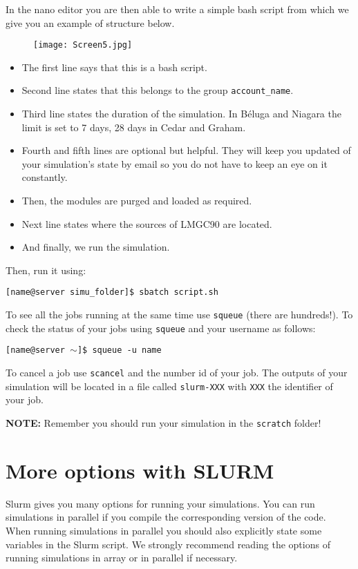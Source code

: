\documentclass[12pt]{article}
\begin{document}
In the nano editor you are then able to write a simple bash script from which we give you an example of structure below.
\begin{figure}[H]
  \centering
  \texttt{[image: Screen5.jpg]}
\end{figure}
\begin{itemize}
    \item The first line says that this is a bash script.
    \item Second line states that this belongs to the group \texttt{account\_name}.
    \item Third line states the duration of the simulation. In Béluga and Niagara the limit is set to 7 days, 28 days in Cedar and Graham.
    \item Fourth and fifth lines are optional but helpful. They will keep you updated of your simulation’s state by email so you do not have to keep an eye on it constantly.
    \item Then, the modules are purged and loaded as required.
    \item Next line states where the sources of LMGC90 are located.
    \item And finally, we run the simulation.
\end{itemize} 

Then, run it using:
\begin{tcolorbox}
\texttt{[name@server simu\_folder]\$ sbatch script.sh}
\end{tcolorbox}

To see all the jobs running at the same time use \texttt{squeue} (there are hundreds!).
To check the status of your jobs using \texttt{squeue} and your username as follows:
\begin{tcolorbox}
\texttt{[name@server $\sim$]\$ squeue -u name}
\end{tcolorbox}
To cancel a job use \texttt{scancel} and the number id of your job.
The outputs of your simulation will be located in a file called \texttt{slurm-XXX} with \texttt{XXX} the identifier of your job.

\textbf{NOTE:} Remember you should run your simulation in the \texttt{scratch} folder!


\section*{More options with SLURM}
Slurm gives you many options for running your simulations. You can run simulations in parallel if you compile the corresponding version of the code. When running simulations in parallel you should also explicitly state some variables in the Slurm script. We strongly recommend reading the options of running simulations in array or in parallel if necessary. 
\end{document}
